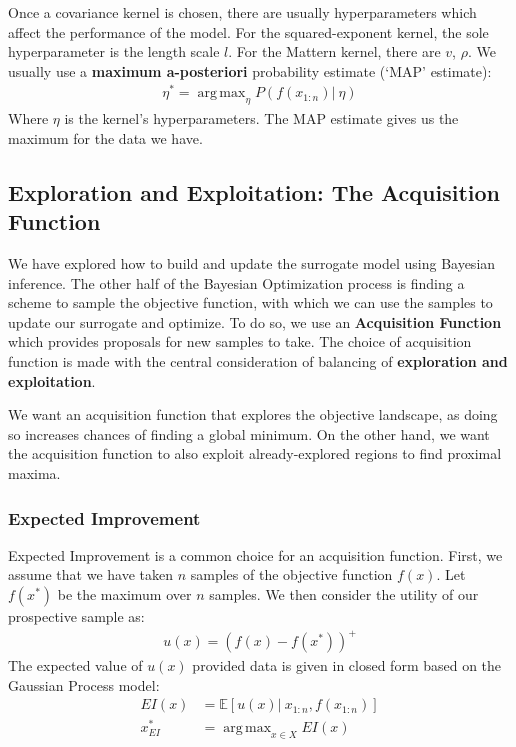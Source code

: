 \documentclass[paper=a4, fontsize=12pt]{scrartcl} %
\numberwithin{equation}{section} %
\numberwithin{figure}{section} %
\numberwithin{table}{section} %
\DeclareMathOperator*{\argmax}{arg\,max}
\begin{document}
Once a covariance kernel is chosen, there are usually hyperparameters which affect the performance of the model. For the squared-exponent kernel, the sole hyperparameter is the length scale $l$. For the 
Mattern kernel, there are $v$, $\rho$. We usually use a \textbf{maximum a-posteriori} probability estimate (`MAP' estimate):
\begin{align*}
    \eta^* = \argmax_\eta P(f(x_{1:n}) |\ \eta)
\end{align*}
Where $\eta$ is the kernel's hyperparameters. The MAP estimate gives us the maximum for the data we have.

\subsection{Exploration and Exploitation: The Acquisition Function}
We have explored how to build and update the surrogate model using Bayesian inference. The other half of the Bayesian Optimization process is finding a scheme to sample the objective function, with which we can use the samples to 
update our surrogate and optimize. To do so, we use an \textbf{Acquisition Function} which provides proposals for new samples to take. The choice of acquisition function is made with the central consideration of 
balancing of \textbf{exploration and exploitation}.

We want an acquisition function that explores the objective landscape, as doing so increases chances of finding a global minimum. On the other hand, we want the acquisition function to also exploit already-explored regions 
to find proximal maxima.

\subsubsection{Expected Improvement}
Expected Improvement is a common choice for an acquisition function. First, we assume that we have taken $n$ samples of the objective function $f(x)$. Let $f(x^*)$ be the maximum over $n$ samples. We then consider the 
utility of our prospective sample as:
\begin{align*}
    u(x) = (f(x) - f(x^*))^+
\end{align*}
The expected value of $u(x)$ provided data is given in closed form based on the Gaussian Process model:
\begin{align*}
    EI(x) &= \mathbb{E}\left[ u(x) |\ x_{1:n}, f(x_{1:n}) \right] \\
    x_{EI}^* &= \argmax_{x \in X} EI(x)
\end{align*}
\end{document}
